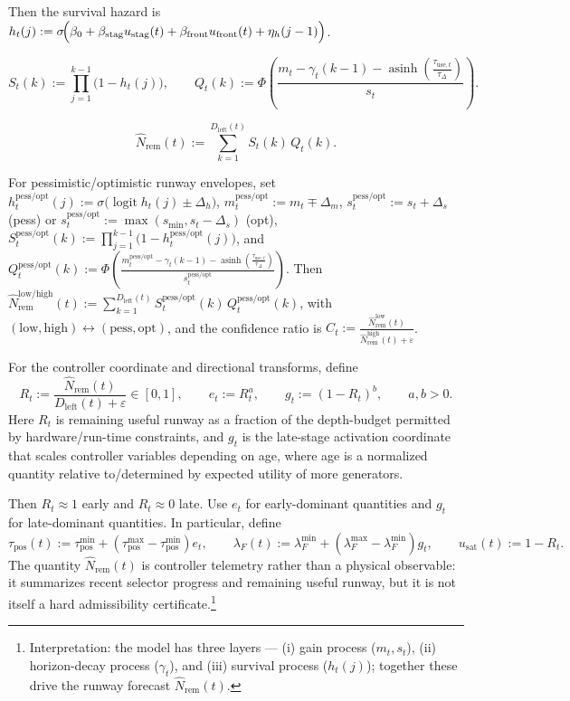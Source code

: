 \documentclass[11pt]{article}
\begin{document}
Then the survival hazard is \(h_t(j):=\sigma\!\Bigl(\beta_0+\beta_{\mathrm{stag}}u_{\mathrm{stag}}(t)+\beta_{\mathrm{front}}u_{\mathrm{front}}(t)+\eta_h(j-1)\Bigr)\).

\[
S_t(k):=\prod_{j=1}^{k-1}\bigl(1-h_t(j)\bigr),
\qquad
Q_t(k):=\Phi\!\left(
\frac{m_t-\gamma_t(k-1)-\operatorname{asinh}\!\left(\frac{\tau_{\mathrm{use},t}}{\tau_\Delta}\right)}{s_t}
\right).
\]

\[
\widehat N_{\mathrm{rem}}(t)
:=
\sum_{k=1}^{D_{\mathrm{left}}(t)}
S_t(k)\,Q_t(k).
\]

For pessimistic/optimistic runway envelopes, set \(h_t^{\mathrm{pess/opt}}(j):=\sigma\!\bigl(\operatorname{logit}h_t(j)\pm\Delta_h\bigr)\), \(m_t^{\mathrm{pess/opt}}:=m_t\mp\Delta_m\), \(s_t^{\mathrm{pess/opt}}:=s_t+\Delta_s\) (pess) or \(s_t^{\mathrm{pess/opt}}:=\max\!\left(s_{\min},s_t-\Delta_s\right)\) (opt), \(S_t^{\mathrm{pess/opt}}(k):=\prod_{j=1}^{k-1}\bigl(1-h_t^{\mathrm{pess/opt}}(j)\bigr)\), and \(Q_t^{\mathrm{pess/opt}}(k):=\Phi\!\left(
\frac{m_t^{\mathrm{pess/opt}}-\gamma_t(k-1)-\operatorname{asinh}\!\left(\frac{\tau_{\mathrm{use},t}}{\tau_\Delta}\right)}{s_t^{\mathrm{pess/opt}}}
\right)\). Then \(\widehat N_{\mathrm{rem}}^{\mathrm{low/high}}(t):=\sum_{k=1}^{D_{\mathrm{left}}(t)} S_t^{\mathrm{pess/opt}}(k)\,Q_t^{\mathrm{pess/opt}}(k)\), with \((\mathrm{low},\mathrm{high})\leftrightarrow(\mathrm{pess},\mathrm{opt})\), and the confidence ratio is \(C_t:=\frac{\widehat N_{\mathrm{rem}}^{\mathrm{low}}(t)}{\widehat N_{\mathrm{rem}}^{\mathrm{high}}(t)+\varepsilon}\).

For the controller coordinate and directional transforms, define
\[
R_t:=\frac{\widehat N_{\mathrm{rem}}(t)}{D_{\mathrm{left}}(t)+\varepsilon}\in[0,1],
\qquad
e_t:=R_t^{a},
\qquad
g_t:=(1-R_t)^{b},
\qquad
a,b>0.
\]
Here \(R_t\) is remaining useful runway as a fraction of the depth-budget permitted by hardware/run-time constraints, and \(g_t\) is the late-stage activation coordinate that scales controller variables depending on age, where age is a normalized quantity relative to/determined by expected utility of more generators.

Then \(R_t\approx 1\) early and \(R_t\approx 0\) late. Use \(e_t\) for early-dominant quantities and \(g_t\) for late-dominant quantities. In particular, define
\[
\tau_{\mathrm{pos}}(t):=\tau_{\mathrm{pos}}^{\min}+(\tau_{\mathrm{pos}}^{\max}-\tau_{\mathrm{pos}}^{\min})e_t,
\qquad
\lambda_F(t):=\lambda_F^{\min}+(\lambda_F^{\max}-\lambda_F^{\min})g_t,
\qquad
u_{\mathrm{sat}}(t):=1-R_t.
\]
The quantity \(\widehat N_{\mathrm{rem}}(t)\) is controller telemetry rather than a physical observable: it summarizes recent selector progress and remaining useful runway, but it is not itself a hard admissibility certificate.\footnote{Interpretation: the model has three layers --- (i) gain process (\(m_t,s_t\)), (ii) horizon-decay process (\(\gamma_t\)), and (iii) survival process (\(h_t(j)\)); together these drive the runway forecast \(\widehat N_{\mathrm{rem}}(t)\).}
\end{document}
